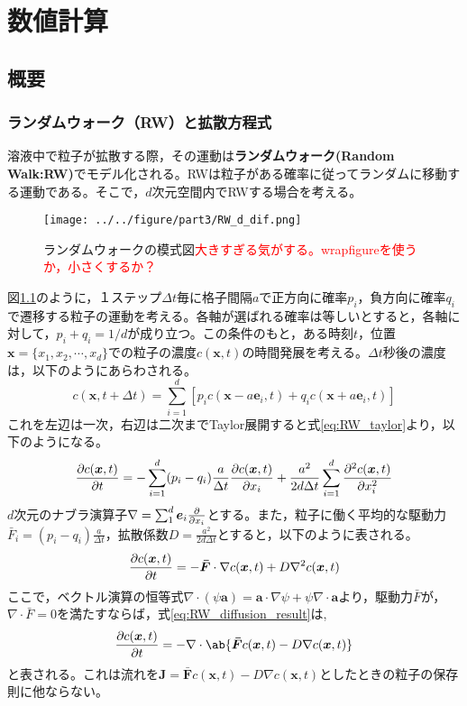 \documentclass[autodetect-engine,dvi=dvipdfmx,a4paper,ja=standard,oneside,openany,11pt]{bxjsbook}
\begin{document}
\chapter{数値計算}
\section{概要}
\subsection{ランダムウォーク（RW）と拡散方程式}
\label{sec:RW}
溶液中で粒子が拡散する際，その運動は\textbf{ランダムウォーク(Random Walk:RW)}でモデル化される。RWは粒子がある確率に従ってランダムに移動する運動である。そこで，$d$次元空間内でRWする場合を考える。
\begin{figure}[htbp]
  \centering
  \texttt{[image: ../../figure/part3/RW\_d\_dif.png]}
  \caption{ランダムウォークの模式図\textcolor{red}{大きすぎる気がする。wrapfigureを使うか，小さくするか？}}
  \label{fig:random_walk}
\end{figure}
図\ref{fig:random_walk}のように，１ステップ$\Delta t$毎に格子間隔$a$で正方向に確率$p_i$，負方向に確率$q_i$で遷移する粒子の運動を考える。各軸が選ばれる確率は等しいとすると，各軸に対して，$p_i+q_i=1/d$が成り立つ。この条件のもと，ある時刻$t$，位置$\bm{x}=\{x_1,x_2,\cdots,x_d\}$での粒子の濃度$c(\bm{x},t)$の時間発展を考える。$\Delta t$秒後の濃度は，以下のようにあらわされる。
\begin{equation}
  c(\bm{x},t+\Delta t)=\sum_{i=1}^{d}\left[p_i c(\bm{x}-a\bm{e}_i,t)+q_i c(\bm{x}+a\bm{e}_i,t)\right]
  \label{eq:RW}
\end{equation}
これを左辺は一次，右辺は二次までTaylor展開すると式\ref{eq:RW_taylor}より，以下のようになる。
\begin{equation}
  \pdv{c(\bm{x},t)}{t}=-\sum_{i=1}^{d}(p_i-q_i)\frac{a}{\Delta t}\pdv{c(\bm{x},t)}{x_i}+\frac{a^2}{2d\Delta t}\sum_{i=1}^{d}\pdv[2]{c(\bm{x},t)}{x_i}
  \label{eq:RW_diffusion}
\end{equation}
$d$次元のナブラ演算子$\nabla=\sum_{1}^{d}\bm{e}_i\pdv*{}{x_i}$とする。また，粒子に働く平均的な駆動力$\bar{F}_i=(p_i-q_i)\frac{a}{\Delta t}$，拡散係数$D=\frac{a^2}{2d\Delta t}$とすると，以下のように表される。
\begin{equation}
  \pdv{c(\bm{x},t)}{t}=-\bm{\bar{F}}\cdot\nabla c(\bm{x},t)+D\nabla^2 c(\bm{x},t)
  \label{eq:RW_diffusion_result}
\end{equation}
ここで，ベクトル演算の恒等式$\nabla\cdot(\psi\bm{a})=\bm{a}\cdot\nabla\psi+\psi\nabla\cdot\bm{a}$より，駆動力$\bar{F}$が，$\nabla\cdot\bar{F}=0$を満たすならば，式\ref{eq:RW_diffusion_result}は,
\begin{equation}
  \pdv{c(\bm{x},t)}{t}=-\nabla\cdot\ab\{\bm{\bar{F}}c(\bm{x},t)-D\nabla c(\bm{x},t)\}
  \label{eq:RW_diffusion_result_divergence}
\end{equation}
と表される。これは流れを$\bm{J}=\bm{\bar{F}}c(\bm{x},t)-D\nabla c(\bm{x},t)$としたときの粒子の保存則に他ならない。
\end{document}
